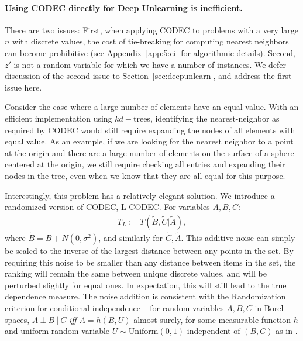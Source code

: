 

\paragraph{Using CODEC directly for Deep Unlearning is inefficient.} There are two issues: First, when applying CODEC to problems with a very large $n$ with discrete values, the cost of tie-breaking for computing nearest neighbors can become prohibitive (see Appendix~\ref{app:5:ci} for algorithmic details). Second, $z'$ is not a random variable for which we have a number of instances. We defer discussion of the second issue  to Section~\ref{sec:deepunlearn}, and address the first issue here.

Consider the case where a large number of elements have an equal value. With an efficient implementation using $kd-$trees, identifying the nearest-neighbor as required by CODEC would still require expanding the nodes of all elements with equal value. As an example, if we are looking for the nearest neighbor to a point at the origin and there are a large number of elements on the surface of a sphere centered at the origin, we still require checking all entries and expanding their nodes in the tree, even when we know that they are all equal for this purpose.

Interestingly, this problem has a relatively elegant solution.
We introduce a randomized version of CODEC, L-CODEC. For variables $A,B,C$:
\begin{align}\label{eq:lcodec}
T_L := T\left(\tilde{B}, \tilde{C} | \tilde{A} \right),
\end{align}
where $\tilde{B} = B + N(0,\sigma^2)$, and similarly for $\tilde{C}, \tilde{A}$.
This additive noise can simply be scaled to the inverse of the largest distance between any points in the set.
By requiring this noise to be smaller than any distance between items in the set, the ranking will remain the same between unique discrete values, and will be perturbed slightly for equal ones.
In expectation, this will still lead to the true dependence measure. The noise addition is consistent with the Randomization criterion for conditional independence -- for random variables $A, B, C$ in Borel spaces, $A\ \bot\ B\ |\ C$ \textit{iff} $A = h(B, U)$ almost surely, for some measurable function $h$ and uniform random variable $U \sim \text{Uniform}(0,1)$ independent of $(B,C)$ as in \cite{ptheory}. 

